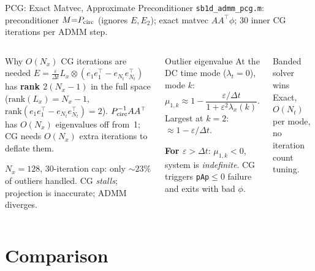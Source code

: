 \documentclass[10pt,aspectratio=169]{beamer}
\newcommand{\eps}{\varepsilon}
\newcommand{\lx}{\lambda_x}
\newcommand{\lt}{\lambda_t}
\newcommand{\Lx}{L_x}
\newcommand{\kron}{\otimes}
\begin{document}
\begin{frame}{PCG: Exact Matvec, Approximate Preconditioner}
  \texttt{sb1d\_admm\_pcg.m}: preconditioner $M{=}P_{\rm circ}$ (ignores $E,E_2$);
  exact matvec $AA^\top\phi$; 30 inner CG iterations per ADMM step.

  \smallskip
  \begin{columns}[T]
    \begin{alertblock}{Why $O(N_x)$ CG iterations are needed}
      $E = \frac\eps{\Delta t}\Lx\kron(e_1 e_1^\top{-}e_{N_t}e_{N_t}^\top)$
      has \textbf{rank $2(N_x{-}1)$} in the full space
      ($\mathrm{rank}(\Lx){=}N_x{-}1$,\ $\mathrm{rank}(e_1e_1^\top{-}e_{N_t}e_{N_t}^\top){=}2$).
      $P_{\rm circ}^{-1}AA^\top$ has $O(N_x)$ eigenvalues off from~1;
      CG needs $O(N_x)$ extra iterations to deflate them.

      \smallskip
      $N_x{=}128$, 30-iteration cap: only $\sim\!23\%$ of outliers
      handled.  CG \emph{stalls}; projection is inaccurate;
      ADMM diverges.
    \end{alertblock}

    \begin{block}{Outlier eigenvalue}
      At the DC time mode ($\lt{=}0$), mode $k$:
      \[
        \mu_{1,k} \approx 1 - \frac{\eps/\Delta t}{1+\eps^2\lx(k)}.
      \]
      Largest at $k{=}2$: $\approx 1{-}\eps/\Delta t$.

      \smallskip
      \textbf{For $\eps>\Delta t$}: $\mu_{1,k}<0$, system is
      \emph{indefinite}.  CG triggers \texttt{pAp}${\leq}0$
      failure and exits with bad $\phi$.
    \end{block}

    \begin{exampleblock}{Banded solver wins}
      Exact, $O(N_t)$ per mode, no iteration count tuning.
    \end{exampleblock}
  \end{columns}
\end{frame}

\section{Comparison}
\end{document}
